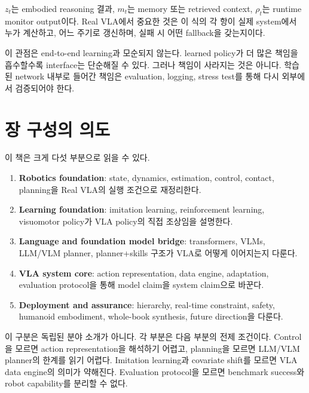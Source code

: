 $z_t$는 embodied reasoning 결과, $m_t$는 memory 또는 retrieved context, $\rho_t$는 runtime monitor output이다. Real VLA에서 중요한 것은 이 식의 각 항이 실제 system에서 누가 계산하고, 어느 주기로 갱신하며, 실패 시 어떤 fallback을 갖는지이다.

이 관점은 end-to-end learning과 모순되지 않는다. learned policy가 더 많은 책임을 흡수할수록 interface는 단순해질 수 있다. 그러나 책임이 사라지는 것은 아니다. 학습된 network 내부로 들어간 책임은 evaluation, logging, stress test를 통해 다시 외부에서 검증되어야 한다.

\section{장 구성의 의도}

이 책은 크게 다섯 부분으로 읽을 수 있다.

\begin{enumerate}
  \item \textbf{Robotics foundation}: state, dynamics, estimation, control, contact, planning을 Real VLA의 실행 조건으로 재정리한다.
  \item \textbf{Learning foundation}: imitation learning, reinforcement learning, visuomotor policy가 VLA policy의 직접 조상임을 설명한다.
  \item \textbf{Language and foundation model bridge}: transformers, VLMs, LLM/VLM planner, planner+skills 구조가 VLA로 어떻게 이어지는지 다룬다.
  \item \textbf{VLA system core}: action representation, data engine, adaptation, evaluation protocol을 통해 model claim을 system claim으로 바꾼다.
  \item \textbf{Deployment and assurance}: hierarchy, real-time constraint, safety, humanoid embodiment, whole-book synthesis, future direction을 다룬다.
\end{enumerate}

이 구분은 독립된 분야 소개가 아니다. 각 부분은 다음 부분의 전제 조건이다. Control을 모르면 action representation을 해석하기 어렵고, planning을 모르면 LLM/VLM planner의 한계를 읽기 어렵다. Imitation learning과 covariate shift를 모르면 VLA data engine의 의미가 약해진다. Evaluation protocol을 모르면 benchmark success와 robot capability를 분리할 수 없다.

